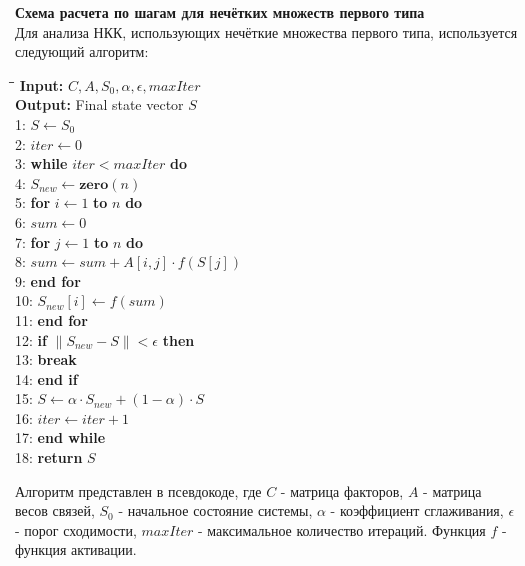 \documentclass{article}
\begin{document}
    \textbf{Схема расчета по шагам для нечётких множеств первого типа}\\
    Для анализа НКК, использующих нечёткие множества первого типа, используется следующий алгоритм:

    \begin{tabbing}
        \hspace*{2em}\= \hspace*{2em}\= \hspace*{2em}\= \kill
        \textbf{Input:} $C, A, S_0, \alpha, \epsilon, maxIter$ \\
        \textbf{Output:} Final state vector $S$ \\
        1: \> $S \gets S_0$ \\
        2: \> $iter \gets 0$ \\
        3: \> \textbf{while} $iter < maxIter$ \textbf{do} \\
        4: \> \> $S_{new} \gets \textbf{zero}(n)$ \\
        5: \> \> \textbf{for} $i \gets 1$ \textbf{to} $n$ \textbf{do} \\
        6: \> \> \> $sum \gets 0$ \\
        7: \> \> \> \textbf{for} $j \gets 1$ \textbf{to} $n$ \textbf{do} \\
        8: \> \> \> \> $sum \gets sum + A[i, j] \cdot f(S[j])$ \\
        9: \> \> \> \textbf{end for} \\
        10: \> \> \> $S_{new}[i] \gets f(sum)$ \\
        11: \> \> \textbf{end for} \\
        12: \> \> \textbf{if} $\|S_{new} - S\| < \epsilon$ \textbf{then} \\
        13: \> \> \> \textbf{break} \\
        14: \> \> \textbf{end if} \\
        15: \> \> $S \gets \alpha \cdot S_{new} + (1 - \alpha) \cdot S$ \\
        16: \> \> $iter \gets iter + 1$ \\
        17: \> \textbf{end while} \\
        18: \> \textbf{return} $S$ \\
    \end{tabbing}
    Алгоритм представлен в псевдокоде, где $C$ - матрица факторов, $A$ - матрица весов связей, $S_0$ - начальное состояние системы, $\alpha$ - коэффициент сглаживания, $\epsilon$ - порог сходимости, $maxIter$ - максимальное количество итераций. Функция $f$ - функция активации.\\
\end{document}
